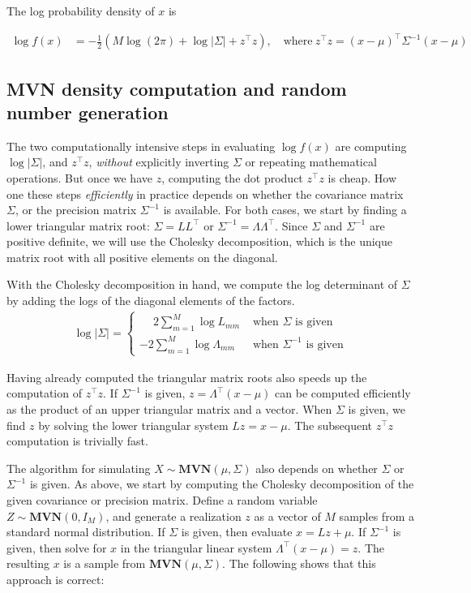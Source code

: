 \documentclass[codesnippet,nojss]{jss}\usepackage[]{graphicx}\usepackage[]{color}
\newcommand{\MVN}[1]{\mathbf{MVN}\!\left(#1\right)}
\begin{document}
The log probability density of $x$ is

\begin{align}
\log f(x)&=-\frac{1}{2}\left(M \log (2\pi) + \log|\Sigma|
  +z^\top z\right),\quad\text{where}~z^\top z=\left(x-\mu\right)^\top\Sigma^{-1}\left(x-\mu\right)
 \end{align}

\subsection{MVN density computation and random number generation}\label{sec:algorithms}

The two computationally intensive steps in evaluating $\log f(x)$ are computing $\log|\Sigma|$, and $z^\top z$, \emph{without} explicitly inverting $\Sigma$ or repeating mathematical operations.  But once we have $z$, computing the dot product $z^\top z$ is cheap. How one these steps \emph{efficiently} in practice depends on whether the covariance matrix $\Sigma$, or the precision matrix $\Sigma^{-1}$ is available. For both cases, we start by finding a lower triangular matrix root: $\Sigma=LL^\top$ or $\Sigma^{-1}=\Lambda\Lambda^\top$.  Since $\Sigma$ and $\Sigma^{-1}$ are positive definite, we will use the Cholesky decomposition, which is the unique matrix root with all positive elements on the diagonal.

With the Cholesky decomposition in hand, we compute the log
determinant of $\Sigma$ by adding the logs of the diagonal elements of
the factors.
\begin{align}
  \label{eq:logDet}
  \log|\Sigma|= \begin{cases}
    \phantom{-}2\sum_{m=1}^M\log L_{mm}&\text{ when $\Sigma$ is given}\\
    -2\sum_{m=1}^M\log \Lambda_{mm}&\text{ when $\Sigma^{-1}$ is given}
    \end{cases}
\end{align}

Having already computed the triangular matrix roots also speeds up the computation of
$z^\top z$.  If $\Sigma^{-1}$ is given, $z=\Lambda^\top(x-\mu)$ can be computed
efficiently as the product of an upper triangular matrix and a
vector. When $\Sigma$ is given, we find $z$ by solving the lower
triangular system $Lz=x-\mu$.  The subsequent $z^\top z$
computation is trivially fast.

The algorithm for simulating  $X\sim\MVN{\mu,\Sigma}$ also
depends on whether
$\Sigma$ or $\Sigma^{-1}$ is given.  As above, we start by computing
the Cholesky decomposition of the given covariance or precision
matrix. Define a random variable $Z\sim\MVN{0,I_M}$, and generate a realization
$z$ as a vector of $M$ samples from a standard normal distribution.  If $\Sigma$ is given,
then evaluate $x=Lz+\mu$.  If $\Sigma^{-1}$ is given, then solve for $x$ in the
triangular linear system $\Lambda^\top\left(x-\mu\right)=z$. The
resulting $x$ is a sample from $\MVN{\mu,\Sigma}$.  The following shows that this approach is correct:
\end{document}
